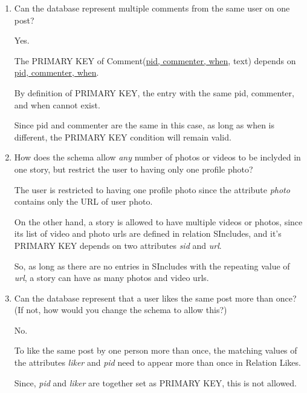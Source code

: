 \documentclass[12pt]{article}
\begin{document}
\begin{enumerate}[1.]
    \item Can the database represent multiple comments from the same user on one post?

    \bigskip

    \begin{mdframed}
        Yes.

        \bigskip

        The PRIMARY KEY of Comment(\ul{pid, commenter, when}, text)
        depends on \ul{pid, commenter, when}.

        \bigskip

        By definition of PRIMARY KEY, the entry with the same pid, commenter, and when cannot exist.

        \bigskip

        Since pid and commenter are the same in this case, as long as when is different,
        the PRIMARY KEY condition will remain valid.
    \end{mdframed}

    \item How does the schema allow \textit{any} number of photos or videos to be
    inclyded in one story, but restrict the user to having only one profile photo?

    \bigskip

    \begin{mdframed}

    The user is restricted to having one profile photo since the attribute
    \textit{photo} contains only the URL of user photo.

    \bigskip

    On the other hand, a story is allowed to have multiple videos or photos, since
    its list of video and photo urls are defined in relation SIncludes, and it's PRIMARY KEY
    depends on two attributes \textit{sid} and \textit{url}.

    \bigskip

    So, as long as there are no entries in SIncludes with the repeating value of
    \textit{url}, a story can have as many photos and video urls.
    \end{mdframed}

    \item Can the database represent that a user likes the same post more than once?
    (If not, how would you change the schema to allow this?)

    \bigskip

    \begin{mdframed}

        No.

        \bigskip

        To like the same post by one person more than once, the matching values of
        the attributes \textit{liker} and \textit{pid} need to appear more than once in
        Relation Likes.

        \bigskip

        Since, \textit{pid} and \textit{liker} are together set as PRIMARY KEY, this
        is not allowed.

    \end{mdframed}
\end{enumerate}
\end{document}
